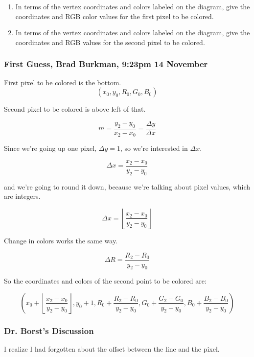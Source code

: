 \documentclass[11pt]{article}
\begin{document}
\begin{spacing}{1.2}
\begin{enumerate}[label=\arabic*)]
	\item In terms of the vertex coordinates and colors labeled on the diagram, give the coordinates and RGB color values for the first pixel to be colored.  
	\item In terms of the vertex coordinates and colors labeled on the diagram, give the coordinates and RGB values for the second pixel to be colored.  
\end{enumerate}

\subsubsection{First Guess, Brad Burkman, 9:23pm 14 November}

First pixel to be colored is the bottom.  
$$(x_0, y_0, R_0, G_0, B_0)$$

Second pixel to be colored is above left of that.  

$$m = \frac{y_2 - y_0}{x_2 - x_0} = \frac{\Delta y}{\Delta x}$$

Since we're going up one pixel, $\Delta y = 1$, so we're interested in $\Delta x$.  

$$\Delta x = \frac{x_2 - x_0}{y_2 - y_0}$$

and we're going to round it down, because we're talking about pixel values, which are integers.  

$$\Delta x = \left\lfloor\frac{x_2 - x_0}{y_2 - y_0}\right\rfloor$$

Change in colors works the same way.  

$$\Delta R = \frac{R_2 - R_0}{y_2 - y_0}$$

So the coordinates and colors of the second point to be colored are:

$$\left( x_0 + \left\lfloor\frac{x_2 - x_0}{y_2 - y_0}\right\rfloor, 
y_0 + 1, 
R_0 + \frac{R_2 - R_0}{y_2 - y_0},
G_0 + \frac{G_2 - G_0}{y_2 - y_0},
B_0 + \frac{B_2 - B_0}{y_2 - y_0}
\right)$$

\subsubsection{Dr. Borst's Discussion}

I realize I had forgotten about the offset between the line and the pixel.  

\end{spacing}
\end{document}
